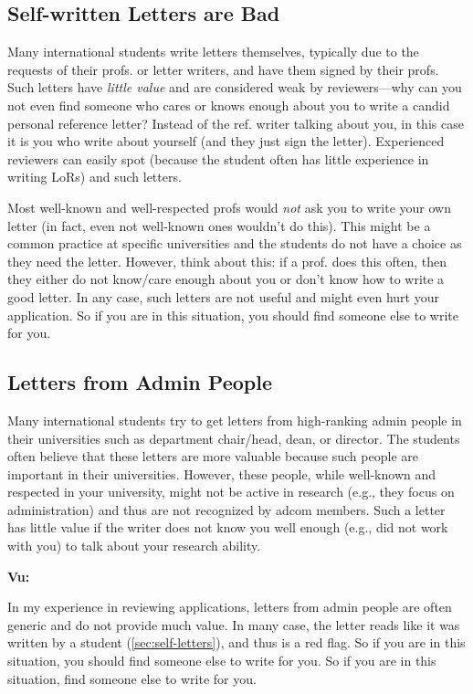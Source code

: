 \documentclass[oneside,11pt,dvipsnames]{book}
\newenvironment{commentbox}[1][]{
  \small
  \begin{mybox}
    {\small \textbf{#1}}
  }{
  \end{mybox}
}
\newcommand{\red}[1]{{\color{red}{#1}}}
\begin{document}
\subsection{Self-written Letters are Bad}\label{sec:self-letters}
 Many international students write letters themselves, typically due to the requests of their profs. or letter writers, and have them signed by their profs. Such letters have \emph{little value} and are considered weak by reviewers---why can you not even find someone who cares or knows enough about you to write a candid personal reference letter?  Instead of the ref. writer talking about you, in this case it is you who write about yourself (and they just sign the letter). Experienced reviewers can easily spot  (because the student often has little experience in writing LoRs) and  \red{red flag} such letters.

Most well-known and well-respected profs would \emph{not} ask you to write your own letter (in fact, even not well-known ones wouldn't do this). This might be a common practice at specific universities and the students do not have a choice as they need the letter.  However, think about this: if a prof. does this often, then they either do not know/care enough about you or don't know how to write a good letter.  In any case, such letters are not useful and might even hurt your application.  So if you are in this situation, you should find someone else to write for you.

\subsection{Letters from Admin People}\label{sec:admin-letters}

Many international students try to get letters from high-ranking admin people in their universities such as department chair/head, dean, or director. The students often believe that these letters are more valuable because such people are important in their universities.  However, these people, while well-known and respected in your university, might not be active in research (e.g., they focus on administration) and thus are not recognized by adcom members. Such a letter has little value if the writer does not know you well enough (e.g., did not work with you) to talk about your research ability. 

\begin{commentbox}[Vu:]
  In my experience in reviewing applications, letters from admin people are often generic and do not provide much value. 
  In many case, the letter reads like it was written by a student (\autoref{sec:self-letters}), and thus is a red flag.  So if you are in this situation, you should find someone else to write for you.
    So if you are in this situation, find someone else to write for you.
\end{commentbox}
\end{document}

